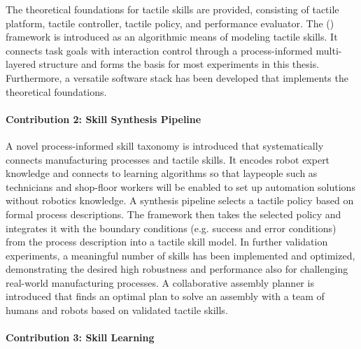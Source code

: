 The theoretical foundations for tactile skills are provided, consisting of tactile platform, tactile controller, tactile policy, and performance evaluator.
The \skillmodel{} (\skillmodelabbr{}) framework is introduced as an algorithmic means of modeling tactile skills.
It connects task goals with interaction control through a process-informed multi-layered structure and forms the basis for most experiments in this thesis.
Furthermore, a versatile software stack \softwareabbr{} has been developed that implements the theoretical foundations.

\paragraph{Contribution 2: Skill Synthesis Pipeline}

A novel process-informed skill taxonomy is introduced that systematically connects manufacturing processes and tactile skills. It encodes robot expert knowledge and connects to learning algorithms so that laypeople such as technicians and shop-floor workers will be enabled to set up automation solutions without robotics knowledge.
A synthesis pipeline selects a tactile policy based on formal process descriptions.
The \skillmodelabbr{} framework then takes the selected policy and integrates it with the boundary conditions (e.g. success and error conditions) from the process description into a tactile skill model.
In further validation experiments, a meaningful number of skills has been implemented and optimized, demonstrating the desired high robustness and performance also for challenging real-world manufacturing processes.
A collaborative assembly planner is introduced that finds an optimal plan to solve an assembly with a team of humans and robots based on validated tactile skills.

\paragraph{Contribution 3: Skill Learning}

